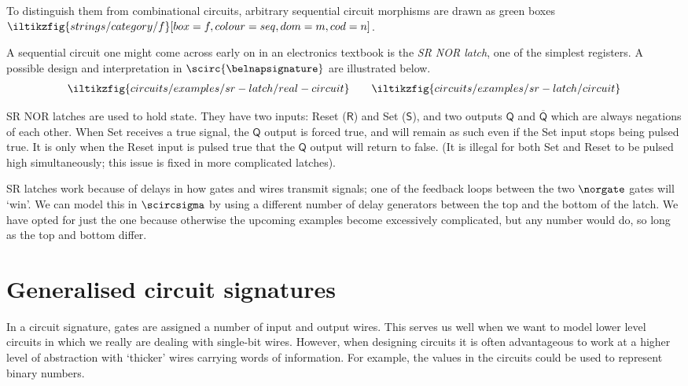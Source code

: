 \documentclass{lmcs}
\begin{document}
To distinguish them from combinational circuits, arbitrary sequential circuit
morphisms are drawn as green boxes \(
\iltikzfig{strings/category/f}[box=f,colour=seq,dom=m,cod=n]
\).

\begin{exa}[SR latch]\label{ex:sr-latch}
    A sequential circuit one might come across early on in an electronics
    textbook is the \emph{SR NOR latch}, one of the simplest registers.
    A possible design and interpretation in \(\scirc{\belnapsignature}\) are
    illustrated below.
    \begin{gather*}
        \iltikzfig{circuits/examples/sr-latch/real-circuit}
        \qquad
        \iltikzfig{circuits/examples/sr-latch/circuit}
    \end{gather*}

    SR NOR latches are used to hold state.
    They have two inputs: Reset (\(\mathsf{R}\)) and Set (\(\mathsf{S}\)), and
    two outputs \(\mathsf{Q}\) and \(\overline{\mathsf{Q}}\) which are always
    negations of each other.
    When Set receives a true signal, the \(\mathsf{Q}\) output is forced true,
    and will remain as such even if the Set input stops being pulsed true.
    It is only when the Reset input is pulsed true that the \(\mathsf{Q}\)
    output will return to false.
    (It is illegal for both Set and Reset to be pulsed high simultaneously; this
    issue is fixed in more complicated latches).

    SR latches work because of delays in how gates and wires transmit signals;
    one of the feedback loops between the two \(\norgate\) gates will `win'.
    We can model this in \(\scircsigma\) by using a different number of delay
    generators between the top and the bottom of the latch.
    We have opted for just the one because otherwise the upcoming examples
    become excessively complicated, but any number would do, so long as the top
    and bottom differ.
\end{exa}

\section{Generalised circuit signatures}

In a circuit signature, gates are assigned a number of input and output wires.
This serves us well when we want to model lower level circuits in which we
really are dealing with single-bit wires.
However, when designing circuits it is often advantageous to work at a higher
level of abstraction with `thicker' wires carrying words of information.
For example, the values in the circuits could be used to represent binary
numbers.
\end{document}
